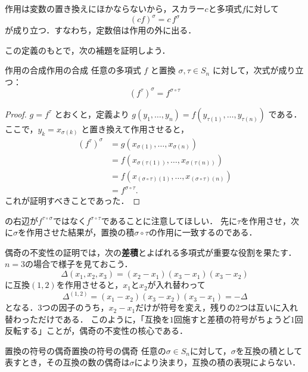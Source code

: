 作用は変数の置き換えにほかならないから，スカラー$c$と多項式$f$に対して
\[
  (cf)^\sigma = c\,f^\sigma
\]
が成り立つ．すなわち，定数倍は作用の外に出る．

この定義のもとで，次の補題を証明しよう．
\begin{lemma}{作用の合成}{作用の合成}
  任意の多項式 $f$ と置換 $\sigma, \tau \in S_n$ に対して，次式が成り立つ：
  \[
  (f^\tau)^\sigma = f^{\sigma \circ \tau}
  \]
\end{lemma}

\begin{tleftbar}
\begin{proof}
  $g = f^\tau$ とおくと，定義より $g(y_1, \dots, y_n) = f(y_{\tau(1)}, \dots, y_{\tau(n)})$ である．
  ここで，$y_k = x_{\sigma(k)}$ と置き換えて作用させると，
  \begin{align*}
    (f^\tau)^\sigma &= g(x_{\sigma(1)}, \dots, x_{\sigma(n)}) \\
    &= f(x_{\sigma(\tau(1))}, \dots, x_{\sigma(\tau(n))}) \\
    &= f(x_{(\sigma \circ \tau)(1)}, \dots, x_{(\sigma \circ \tau)(n)}) \\
    &= f^{\sigma \circ \tau}.
  \end{align*}
  これが証明すべきことであった．
\end{proof}
\end{tleftbar}

の右辺が$f^{\tau \circ \sigma}$ではなく$f^{\sigma \circ \tau}$であることに注意してほしい．
先に$\tau$を作用させ，次に$\sigma$を作用させた結果が，置換の積$\sigma \circ \tau$の作用に一致するのである．

偶奇の不変性の証明では，次の\textbf{差積}とよばれる多項式が重要な役割を果たす．
$n = 3$の場合で様子を見ておこう．
\[
  \Delta(x_1, x_2, x_3) = (x_2 - x_1)(x_3 - x_1)(x_3 - x_2)
\]
に互換$(1, 2)$を作用させると，$x_1$と$x_2$が入れ替わって
\[
  \Delta^{(1,2)} = (x_1 - x_2)(x_3 - x_2)(x_3 - x_1) = -\Delta
\]
となる．$3$つの因子のうち，$x_2 - x_1$だけが符号を変え，残りの$2$つは互いに入れ替わっただけである．
このように，「互換を$1$回施すと差積の符号がちょうど$1$回反転する」ことが，偶奇の不変性の核心である．

\begin{prop}{置換の符号の偶奇}{置換の符号の偶奇}
  任意の$\sigma \in S_n$に対して，$\sigma$を互換の積として表すとき，その互換の数の偶奇は$\sigma$により決まり，互換の積の表現によらない．
\end{prop}

